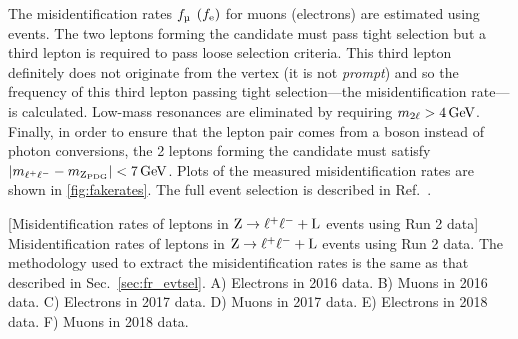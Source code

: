 The misidentification rates $f_{\Pmu}$ $(f_{\mathrm{e}})$ for muons (electrons) are estimated using \ztolplm events.
The two leptons forming the \PZ candidate must pass tight selection but a third lepton is required to pass loose selection criteria.
This third lepton definitely does not originate from the \PZ vertex (\ie it is not \emph{prompt}) and so the frequency of this third lepton passing tight selection---the misidentification rate---is calculated.
Low-mass resonances are eliminated by requiring $m_{2\ell} > 4\,\text{Ge\hspace{-.08em}V}$.
Finally, in order to ensure that the lepton pair comes from a \PZ boson instead of photon conversions, the 2 leptons forming the \PZ candidate must satisfy $\lvert m_{\ell^+ \ell^-} - m_{\text{Z}_{\text{PDG}}} \rvert < 7\,\text{Ge\hspace{-.08em}V}$.
Plots of the measured misidentification rates are shown in \cref{fig:fakerates}.
The full event selection is described in Ref.~\cite{CMS-PAS-HIG-19-007}.
\begin{multiFigure}
    \centering
        [Misidentification rates of leptons in $\text{Z} \to \ell^+ \ell^- + \text{L}$ events using Run 2 data]
        {Misidentification rates of leptons in $\text{Z} \to \ell^+ \ell^- + \text{L}$ events using Run 2 data.
        The methodology used to extract the misidentification rates is the same as that described in Sec.~\ref{sec:fr_evtsel}.
        \;A) Electrons in 2016 data.
        \;B) Muons in 2016 data.
        \;C) Electrons in 2017 data.
        \;D) Muons in 2017 data.
        \;E) Electrons in 2018 data.
        \;F) Muons in 2018 data.}
    \label{fig:fakerates}
\end{multiFigure}
